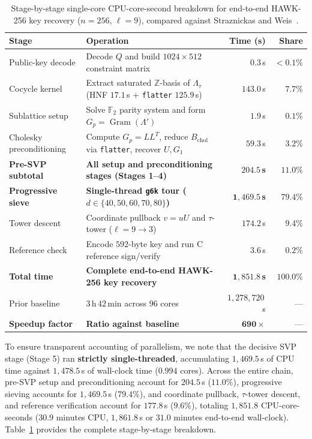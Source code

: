 \documentclass[11pt,a4paper]{article}
\theoremstyle{definition}
\newcommand{\Z}{\mathbb{Z}}
\newcommand{\F}{\mathbb{F}}
\newcommand{\Lt}{\Lambda_\tau}
\newcommand{\Lp}{\Lambda'}
\newcommand{\Gram}{\operatorname{Gram}}
\begin{document}
\begin{table}[t]
\centering
\footnotesize
\setlength{\tabcolsep}{2.8pt}
\caption{Stage-by-stage single-core CPU-core-second breakdown for end-to-end HAWK-256 key recovery ($n=256$, $\ell=9$), compared against Straznickas and Weis~\cite{SW26}.}
\label{tab:timing}
\begin{tabular}{@{}llrr@{}}
\toprule
\textbf{Stage} & \textbf{Operation} & \textbf{Time (s)} & \textbf{Share} \\
\midrule
Public-key decode & Decode $Q$ and build $1024\times 512$ constraint matrix & $0.3$\,s & $<0.1\%$ \\
Cocycle kernel & Extract saturated $\Z$-basis of $\Lt$ (HNF $17.1$\,s + \texttt{flatter} $125.9$\,s) & $143.0$\,s & $7.7\%$ \\
Sublattice setup & Solve $\F_2$ parity system and form $G_p = \Gram(\Lp)$ & $1.9$\,s & $0.1\%$ \\
Cholesky preconditioning & Compute $G_p = LL^T$, reduce $B_{\mathrm{chol}}$ via \texttt{flatter}, recover $U, G_1$ & $59.3$\,s & $3.2\%$ \\
\midrule
\textbf{Pre-SVP subtotal} & \textbf{All setup and preconditioning stages (Stages 1--4)} & $\mathbf{204.5}$\,\textbf{s} & $\mathbf{11.0\%}$ \\
\midrule
\textbf{Progressive sieve} & \textbf{Single-thread \texttt{g6k} tour ($d \in \{40,50,60,70,80\}$)} & $\mathbf{1{,}469.5}$\,\textbf{s} & $\mathbf{79.4\%}$ \\
\midrule
Tower descent & Coordinate pullback $v = uU$ and $\tau$-tower ($\ell=9\to 3$) & $174.2$\,s & $9.4\%$ \\
Reference check & Encode $592$-byte key and run C reference sign/verify & $3.6$\,s & $0.2\%$ \\
\midrule
\textbf{Total time} & \textbf{Complete end-to-end HAWK-256 key recovery} & $\mathbf{1{,}851.8}$\,\textbf{s} & $\mathbf{100.0\%}$ \\
\midrule
Prior baseline~\cite{SW26} & $3$\,h\,$42$\,min across $96$ cores & $1{,}278{,}720$\,s & --- \\
\textbf{Speedup factor} & \textbf{Ratio against baseline~\cite{SW26}} & $\mathbf{690\times}$ & --- \\
\bottomrule
\end{tabular}
\end{table}

To ensure transparent accounting of parallelism, we note that the decisive SVP stage (Stage 5) ran \textbf{strictly single-threaded}, accumulating $1{,}469.5$\,s of CPU time against $1{,}478.5$\,s of wall-clock time ($0.994$ cores). Across the entire chain, pre-SVP setup and preconditioning account for $204.5$\,s ($11.0\%$), progressive sieving accounts for $1{,}469.5$\,s ($79.4\%$), and coordinate pullback, $\tau$-tower descent, and reference verification account for $177.8$\,s ($9.6\%$), totaling $1{,}851.8$ CPU-core-seconds ($30.9$ minutes CPU, $1{,}861.8$\,s or $31.0$ minutes end-to-end wall-clock). Table~\ref{tab:timing} provides the complete stage-by-stage breakdown.
\end{document}

